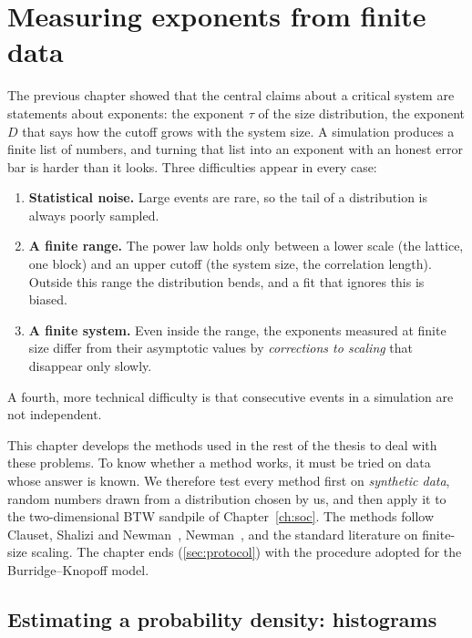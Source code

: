 \chapter{Measuring exponents from finite data}
\label{ch:measuring}



The previous chapter showed that the central claims about a critical system are statements about
exponents: the exponent $\tau$ of the size distribution, the exponent $D$ that says how the cutoff
grows with the system size. A simulation produces a finite list of numbers, and turning that list
into an exponent with an honest error bar is harder than it looks. Three difficulties appear in
every case:
\begin{enumerate}[nosep]
  \item \textbf{Statistical noise.} Large events are rare, so the tail of a distribution is always
    poorly sampled.
  \item \textbf{A finite range.} The power law holds only between a lower scale (the lattice, one
    block) and an upper cutoff (the system size, the correlation length). Outside this range the
    distribution bends, and a fit that ignores this is biased.
  \item \textbf{A finite system.} Even inside the range, the exponents measured at finite size
    differ from their asymptotic values by \emph{corrections to scaling} that disappear only slowly.
\end{enumerate}
A fourth, more technical difficulty is that consecutive events in a simulation are not independent.

This chapter develops the methods used in the rest of the thesis to deal with these problems. To
know whether a method works, it must be tried on data whose answer is known. We therefore test every
method first on \emph{synthetic data}, random numbers drawn from a distribution chosen by us, and then
apply it to the two-dimensional BTW sandpile of Chapter~\ref{ch:soc}. The methods follow
Clauset, Shalizi and Newman~\cite{Clauset2009}, Newman~\cite{Newman2005}, and the standard literature on
finite-size scaling. The chapter ends (\cref{sec:protocol}) with the procedure adopted for the
Burridge--Knopoff model.

\section{Estimating a probability density: histograms}
\label{sec:histograms}

